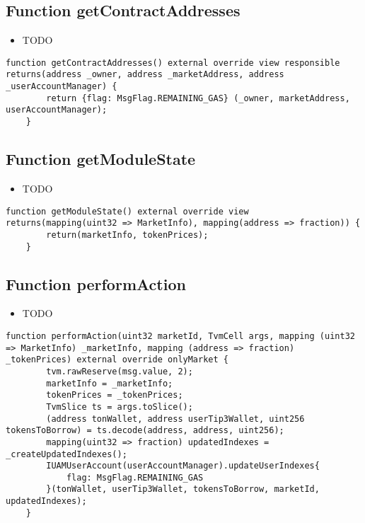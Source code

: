 \subsection{Function getContractAddresses}

\noindent\begin{itemize}
\item TODO
\end{itemize}

\begin{lstlisting}[firstnumber=77]
    function getContractAddresses() external override view responsible returns(address _owner, address _marketAddress, address _userAccountManager) {
        return {flag: MsgFlag.REMAINING_GAS} (_owner, marketAddress, userAccountManager);
    }
\end{lstlisting}

\subsection{Function getModuleState}

\noindent\begin{itemize}
\item TODO
\end{itemize}

\begin{lstlisting}[firstnumber=61]
    function getModuleState() external override view returns(mapping(uint32 => MarketInfo), mapping(address => fraction)) {
        return(marketInfo, tokenPrices);
    }
\end{lstlisting}

\subsection{Function performAction}

\noindent\begin{itemize}
\item TODO
\end{itemize}

\begin{lstlisting}[firstnumber=87]
    function performAction(uint32 marketId, TvmCell args, mapping (uint32 => MarketInfo) _marketInfo, mapping (address => fraction) _tokenPrices) external override onlyMarket {
        tvm.rawReserve(msg.value, 2);
        marketInfo = _marketInfo;
        tokenPrices = _tokenPrices;
        TvmSlice ts = args.toSlice();
        (address tonWallet, address userTip3Wallet, uint256 tokensToBorrow) = ts.decode(address, address, uint256);
        mapping(uint32 => fraction) updatedIndexes = _createUpdatedIndexes();
        IUAMUserAccount(userAccountManager).updateUserIndexes{
            flag: MsgFlag.REMAINING_GAS
        }(tonWallet, userTip3Wallet, tokensToBorrow, marketId, updatedIndexes);
    }
\end{lstlisting}

